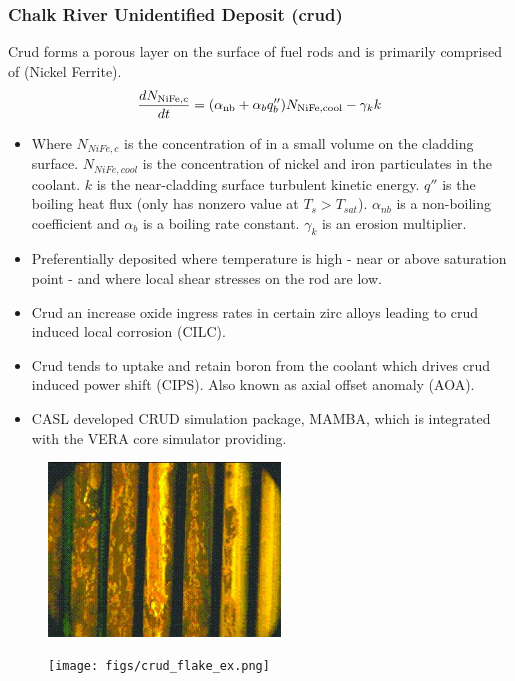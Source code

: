 \documentclass[t, pdftex]{beamer}
\begin{document}
\begin{frame}
\frametitle{Chalk River Unidentified Deposit (crud)}
\vspace{-12pt}
Crud forms a porous layer on the surface of fuel rods and is primarily comprised of  (Nickel Ferrite).
\[
    \frac{d N_{\mathrm{\ce{NiFe}},c}}{dt} = (\alpha_{\mathrm{nb}} + \alpha_{b}q''_{b} )N_{\mathrm{\ce{NiFe}}, \mathrm{cool}} - \gamma_k k
\]
\begin{tiny}
    \begin{itemize}
    \item Where $N_{NiFe,c}$ is the concentration of  in a small volume on the cladding surface. $N_{NiFe,cool}$ is the concentration of nickel and iron particulates in the coolant.  $k$ is the near-cladding surface turbulent kinetic energy.  $q''$ is the boiling heat flux (only has nonzero value at $T_s>T_{sat}$).  $\alpha_{nb}$ is a non-boiling coefficient and $\alpha_b$ is a boiling rate constant.  $\gamma_k$ is an erosion multiplier.
    \item Preferentially deposited where temperature is high - near or above saturation point - and where local shear stresses on the rod are low.
	\item Crud an increase oxide ingress rates in certain zirc alloys leading to crud induced local corrosion (CILC).
    \item Crud tends to uptake and retain boron from the coolant which drives
          crud induced power shift (CIPS). Also known as axial offset anomaly (AOA).
    \item CASL developed CRUD simulation package, MAMBA, which is integrated with the VERA core simulator providing.  
    \end{itemize}
\end{tiny}
\vspace{-12pt}
    \begin{figure}
        \centering
        \begin{minipage}{.5\textwidth}
            \centering
            \includegraphics[width=0.55\textwidth]{figs/crud-crud.jpg}
        \end{minipage}%
        \begin{minipage}{.5\textwidth}
            \centering
            \texttt{[image: figs/crud\_flake\_ex.png]}
        \end{minipage}
    \end{figure}
\end{frame}
\end{document}
